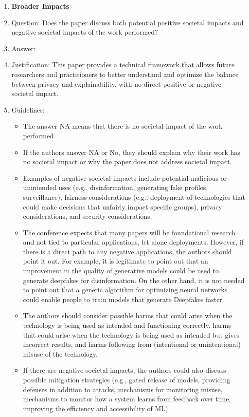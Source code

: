 \documentclass{article}
\begin{document}
\begin{enumerate}
\item {\bf Broader Impacts}
    \item[] Question: Does the paper discuss both potential positive societal impacts and negative societal impacts of the work performed?
    \item[] Answer: \answerNA{} %
    \item[] Justification: This paper provides a technical framework that allows future researchers and practitioners to better understand and optimize the balance between privacy and explainability, with no direct positive or negative societal impact.
    \item[] Guidelines:
    \begin{itemize}
        \item The answer NA means that there is no societal impact of the work performed.
        \item If the authors answer NA or No, they should explain why their work has no societal impact or why the paper does not address societal impact.
        \item Examples of negative societal impacts include potential malicious or unintended uses (e.g., disinformation, generating fake profiles, surveillance), fairness considerations (e.g., deployment of technologies that could make decisions that unfairly impact specific groups), privacy considerations, and security considerations.
        \item The conference expects that many papers will be foundational research and not tied to particular applications, let alone deployments. However, if there is a direct path to any negative applications, the authors should point it out. For example, it is legitimate to point out that an improvement in the quality of generative models could be used to generate deepfakes for disinformation. On the other hand, it is not needed to point out that a generic algorithm for optimizing neural networks could enable people to train models that generate Deepfakes faster.
        \item The authors should consider possible harms that could arise when the technology is being used as intended and functioning correctly, harms that could arise when the technology is being used as intended but gives incorrect results, and harms following from (intentional or unintentional) misuse of the technology.
        \item If there are negative societal impacts, the authors could also discuss possible mitigation strategies (e.g., gated release of models, providing defenses in addition to attacks, mechanisms for monitoring misuse, mechanisms to monitor how a system learns from feedback over time, improving the efficiency and accessibility of ML).
    \end{itemize}


\end{enumerate}
\end{document}
